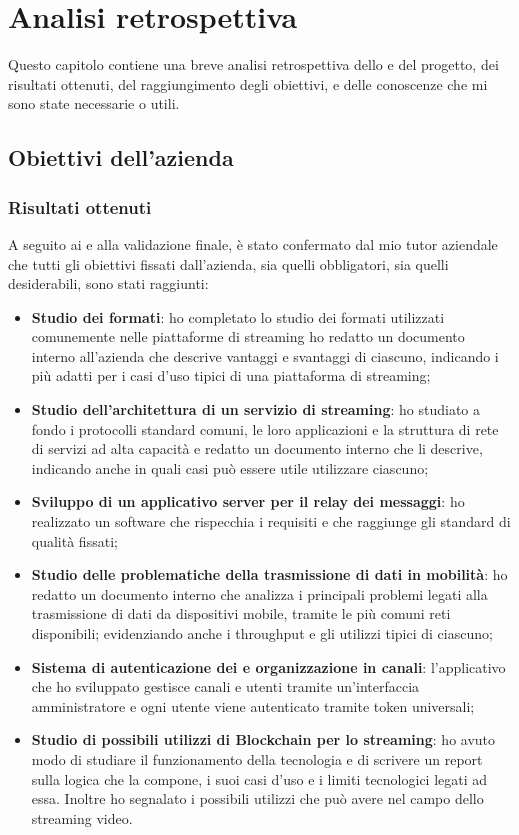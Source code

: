 \chapter{Analisi retrospettiva}
Questo capitolo contiene una breve analisi retrospettiva dello  e del progetto, dei risultati ottenuti, del raggiungimento degli obiettivi, e delle conoscenze che mi sono state necessarie o utili.

\section{Obiettivi dell'azienda}

\subsection{Risultati ottenuti}
A seguito ai  e alla validazione finale, è stato confermato dal mio tutor aziendale che tutti gli obiettivi fissati dall'azienda, sia quelli obbligatori, sia quelli desiderabili, sono stati raggiunti:
\begin{itemize}
   \item \textbf{Studio dei formati}: ho completato lo studio dei formati utilizzati comunemente nelle piattaforme di streaming ho redatto un documento interno all'azienda che descrive vantaggi e svantaggi di ciascuno, indicando i più adatti per i casi d'uso tipici di una piattaforma di streaming;
   \item \textbf{Studio dell'architettura di un servizio di streaming}: ho studiato a fondo i protocolli standard comuni, le loro applicazioni e la struttura di rete di servizi ad alta capacità e redatto un documento interno che li descrive, indicando anche in quali casi può essere utile utilizzare ciascuno;
   \item \textbf{Sviluppo di un applicativo server per il relay dei messaggi}: ho realizzato un software che rispecchia i requisiti e che raggiunge gli standard di qualità fissati;
   \item \textbf{Studio delle problematiche della trasmissione di dati in mobilità}: ho redatto un documento interno che analizza i principali problemi legati alla trasmissione di dati da dispositivi mobile, tramite le più comuni reti disponibili; evidenziando anche i throughput e gli utilizzi tipici di ciascuno;
   \item \textbf{Sistema di autenticazione dei  e organizzazione in canali}: l'applicativo che ho sviluppato gestisce canali e utenti tramite un'interfaccia amministratore e ogni utente viene autenticato tramite token universali;
   \item \textbf{Studio di possibili utilizzi di Blockchain per lo streaming}: ho avuto modo di studiare il funzionamento della tecnologia e di scrivere un report sulla logica che la compone, i suoi casi d'uso e i limiti tecnologici legati ad essa. Inoltre ho segnalato i possibili utilizzi che può avere nel campo dello streaming video.
\end{itemize}
